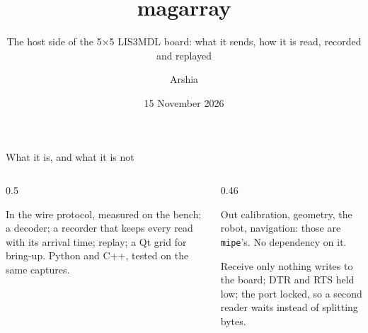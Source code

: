\documentclass[aspectratio=169,11pt]{beamer}
\title{magarray}
\subtitle{The host side of the 5×5 LIS3MDL board: what it sends, how it is read, recorded and replayed}
\author{Arshia}
\date{15 November 2026}
\begin{document}
\maketitle

\begin{frame}{What it is, and what it is not}
  \begin{columns}[T]
    \begin{column}{0.5\textwidth}
      \begin{block}{In}
        the wire protocol, measured on the bench; a decoder; a recorder that keeps every read with its arrival time; replay; a Qt grid for bring-up. Python and C++, tested on the same captures.
      \end{block}
    \end{column}
    \begin{column}{0.46\textwidth}
      \begin{block}{Out}
        calibration, geometry, the robot, navigation: those are \texttt{mipe}'s. No dependency on it.
      \end{block}
      \begin{block}{Receive only}
        nothing writes to the board; DTR and RTS held low; the port locked, so a second reader waits instead of splitting bytes.
      \end{block}
    \end{column}
  \end{columns}
\end{frame}
\end{document}
